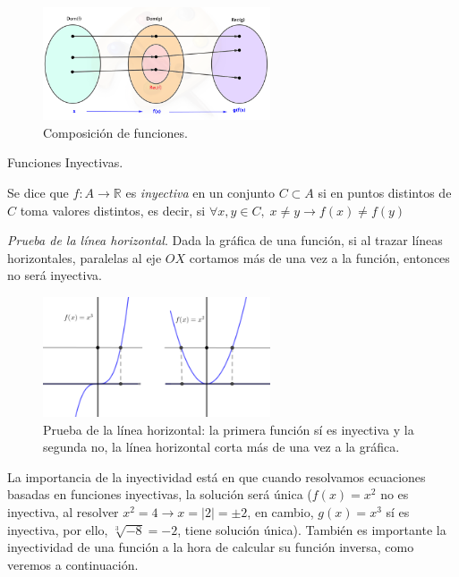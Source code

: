	\begin{figure}[H]
		\centering
		\includegraphics[width=0.6\textwidth]{imagenes/imagenes02/T02IM03.png}
		\caption{Composición de funciones.}
	\end{figure}
		

		\begin{defi}{Funciones Inyectivas}.
		
		 Se dice que $f:A\to \mathbb R$ es \emph{inyectiva} en un conjunto $C \subset A$ si en puntos distintos de $C$ toma valores distintos, es decir, si $\forall x,y \in C,\; x\neq y \to f(x) \neq f(y)$ 	
	
		\end{defi}
		\emph{Prueba de la lí­nea horizontal}. Dada la gráfica de una función, si al trazar lí­neas horizontales, paralelas al eje $OX$ cortamos más de una vez a la función, entonces no será inyectiva.
		
		\begin{figure}[H]
			\centering
			\includegraphics[width=0.6\textwidth]{imagenes/imagenes02/T02IM04.png}
			\caption{Prueba de la lí­nea horizontal: la primera función sí­ es inyectiva y la segunda no, la lí­nea horizontal corta más de una vez a la gráfica.}
		\end{figure}
		
		La importancia de la inyectividad está en que cuando resolvamos ecuaciones basadas en funciones inyectivas, la solución será única ($f(x)=x^2$ no es inyectiva, al resolver $x^2=4 \to x=|2|=\pm 2$, en cambio, $g(x)=x^3$ sí­ es inyectiva, por ello, $\sqrt [3] {-8}=-2$, tiene solución única). También es importante la inyectividad de una función a la hora de calcular su función inversa, como veremos a continuación.
		
